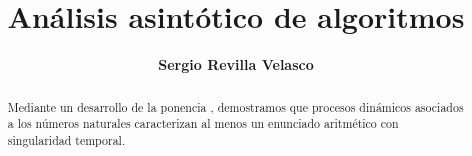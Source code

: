 \documentclass[11pt]{article}
\title{\huge{\textbf{Análisis asintótico de algoritmos}}}
\author{\large{\textbf{Sergio Revilla Velasco}}}
\date{}
\begin{document}
\maketitle
\begin{abstract}
Mediante un desarrollo de la ponencia  \cite{Pon}, demostramos que procesos dinámicos asociados a los números naturales caracterizan al menos un enunciado aritmético con singularidad temporal.
\end{abstract}

\tableofcontents{}
\end{document}
